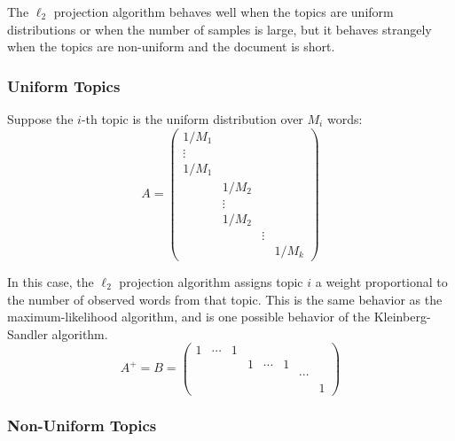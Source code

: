 \documentclass{article}
\begin{document}
The \(\ell_2\) projection algorithm behaves well when the topics are uniform distributions or when the number of samples is large, but it behaves strangely when the topics are non-uniform and the document is short.

\subsubsection{Uniform Topics}
\label{Sec:L2DisjointUniform}

Suppose the \(i\)-th topic is the uniform distribution over \(M_i\) words:
\[
    A =
    \begin{pmatrix}
        1/M_1  &        &        &
    \\  \vdots &        &        &
    \\  1/M_1  &        &        &
    \\         & 1/M_2  &        &
    \\         & \vdots &        &
    \\         & 1/M_2  &        &
    \\         &        & \vdots &
    \\         &        &        & 1/M_k
    \end{pmatrix}
\]

In this case, the \(\ell_2\) projection algorithm assigns topic \(i\) a weight proportional to the number of observed words from that topic.
This is the same behavior as the maximum-likelihood algorithm, and is one possible behavior of the Kleinberg-Sandler algorithm.
\[
    A^+ = B =
    \begin{pmatrix}
        1 & \cdots & 1 &   &        &   &        &
    \\    &        &   & 1 & \cdots & 1 &        &
    \\    &        &   &   &        &   & \cdots &
    \\    &        &   &   &        &   &        & 1
    \end{pmatrix}
\]

\subsubsection{Non-Uniform Topics}
\label{Sec:L2DisjointNonUniform}
\end{document}
